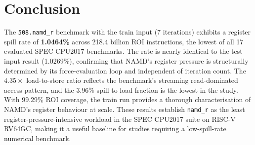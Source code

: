 \documentclass[conference]{IEEEtran}
\begin{document}
\section{Conclusion}

The \texttt{508.namd\_r} benchmark with the train input (7 iterations)
exhibits a register spill rate of \textbf{1.0464\%} across
218.4 billion ROI instructions, the lowest of all 17 evaluated SPEC
CPU2017 benchmarks. The rate is nearly identical to the test input
result (1.0269\%), confirming that NAMD's register pressure is
structurally determined by its force-evaluation loop and independent
of iteration count. The $4.35\times$ load-to-store ratio reflects the
benchmark's streaming read-dominated access pattern, and the 3.96\%
spill-to-load fraction is the lowest in the study. With 99.29\% ROI
coverage, the train run provides a thorough characterisation of
NAMD's register behaviour at scale. These results establish
\texttt{namd\_r} as the least register-pressure-intensive workload in
the SPEC CPU2017 suite on RISC-V RV64GC, making it a useful baseline
for studies requiring a low-spill-rate numerical benchmark.
\end{document}
